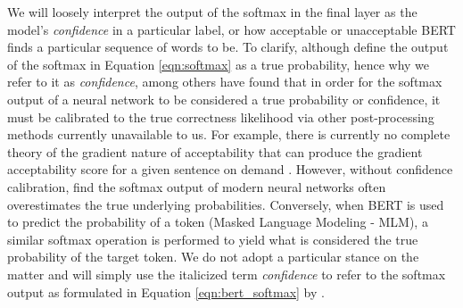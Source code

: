 We will loosely interpret the output of the softmax in the final layer as the model's \textit{confidence} in a particular label, or how acceptable or unacceptable BERT finds a particular sequence of words to be.  To clarify, although \citet{sun2019} define the output of the softmax in Equation \ref{eqn:softmax} as a true probability, hence why we refer to it as \textit{confidence}, \citet{guo2017calibration} among others have found that in order for the softmax output of a neural network to be considered a true probability or confidence, it must be calibrated to the true correctness likelihood via other post-processing methods currently unavailable to us.  For example, there is currently no complete theory of the gradient nature of acceptability that can produce the gradient acceptability score for a given sentence on demand \citep{sprouse2012assessing}.  However, without confidence calibration, \citet{guo2017calibration} find the softmax output of modern neural networks often overestimates the true underlying probabilities.  Conversely, when BERT is used to predict the probability of a token (Masked Language Modeling - MLM), a similar softmax operation is performed to yield what is considered the true probability of the target token.  We do not adopt a particular stance on the matter and will simply use the italicized term \textit{confidence} to refer to the softmax output as formulated in Equation \ref{eqn:bert_softmax} by \citet{sun2019}.

